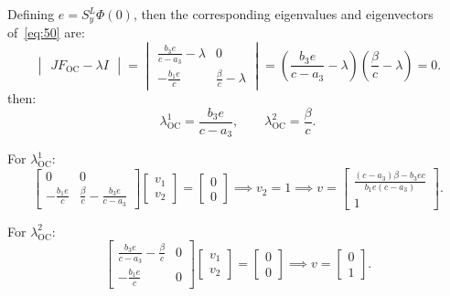 Defining $e=S^{L}_{y}\Phi\left(0\right)$, then the corresponding
eigenvalues and eigenvectors of~\eqref{eq:50} are:
\begin{equation*}
	\begin{vmatrix}
		JF_{\text{OC}}-\lambda I
	\end{vmatrix}=
	\begin{vmatrix}
		\frac{b_{3}e}{c-a_{3}}-\lambda & 0                       \\
		-\frac{b_{1}e}{c}              & \frac{\beta}{c}-\lambda
	\end{vmatrix}=
	\left(\frac{b_{3}e}{c-a_{3}}-\lambda\right)
	\left(\frac{\beta}{c}-\lambda\right)=
	0.
\end{equation*}
then:
\begin{equation*}
	\lambda^{1}_{\text{OC}}=
	\frac{b_{3}e}{c-a_{3}},\qquad
	\lambda^{2}_{\text{OC}}=
	\frac{\beta}{c}.
\end{equation*}

For $\lambda^{1}_{\text{OC}}$:
\begin{equation*}
	\begin{bmatrix}
		0                 & 0                                      \\
		-\frac{b_{1}e}{c} & \frac{\beta}{c}-\frac{b_{3}e}{c-a_{3}}
	\end{bmatrix}
	\begin{bmatrix}
		v_{1} \\
		v_{2}
	\end{bmatrix}=
	\begin{bmatrix}
		0 \\
		0
	\end{bmatrix}\implies
	v_{2}=1\implies
	v=\begin{bmatrix}
		\frac{
			\left(c-a_{3}\right)\beta-b_{3}ec
		}{b_{1}e\left(c-a_{3}\right)} \\
		1
	\end{bmatrix}.
\end{equation*}

For $\lambda^{2}_{\text{OC}}$:
\begin{equation*}
	\begin{bmatrix}
		\frac{b_{3}e}{c-a_{3}}-\frac{\beta}{c} & 0 \\
		-\frac{b_{1}e}{c}                      & 0
	\end{bmatrix}
	\begin{bmatrix}
		v_{1} \\
		v_{2}
	\end{bmatrix}=
	\begin{bmatrix}
		0 \\
		0
	\end{bmatrix}\implies
	v=\begin{bmatrix}
		0 \\
		1
	\end{bmatrix}.
\end{equation*}


